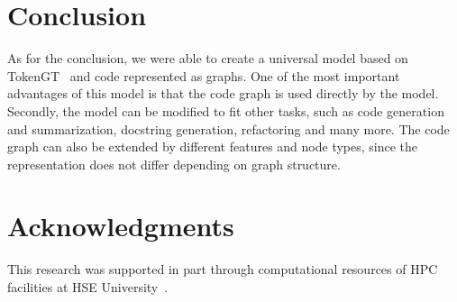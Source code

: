 \documentclass[conference]{IEEEtran}
\begin{document}
\section{Conclusion}\label{sec:conclusion}

As for the conclusion, we were able to create a universal model based on TokenGT~\cite{kim_pure_2022} and code represented as graphs.
One of the most important advantages of this model is that the code graph is used directly by the model.
Secondly, the model can be modified to fit other tasks, such as code generation and summarization, docstring generation, refactoring and many more.
The code graph can also be extended by different features and node types, since the representation does not differ depending on graph structure.

\section{Acknowledgments}\label{sec:acknowledgments}

This research was supported in part through computational resources of HPC facilities at HSE University~\cite{kostenetskiy_hpc_2021}.

\printbibliography
\end{document}
